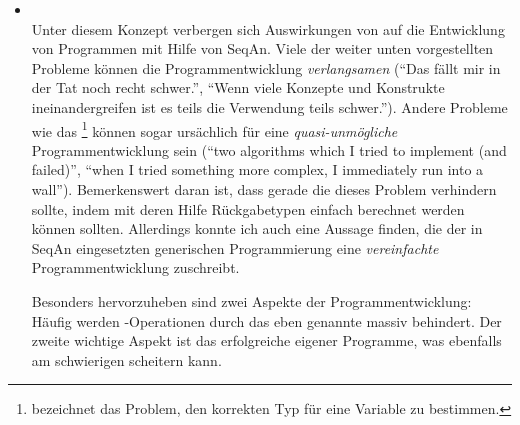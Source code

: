 \begin{itemize}
  \item[\codebullet{apiua://code/-9223372036854775455}] \textbf{} \\
  Unter diesem Konzept verbergen sich Auswirkungen von  auf die Entwicklung von Programmen mit Hilfe von SeqAn. Viele der weiter unten vorgestellten Probleme können die Programmentwicklung \textit{verlangsamen} (``Das fällt mir in der Tat noch recht schwer.'', ``Wenn viele Konzepte und Konstrukte ineinandergreifen ist es teils die Verwendung teils schwer.''). Andere Probleme wie das \footnote{ bezeichnet das Problem, den korrekten Typ für eine Variable zu bestimmen.} können sogar ursächlich für eine \textit{quasi-unmögliche} Programmentwicklung sein (``two algorithms which I tried to implement (and failed)'', ``when I tried something more complex, I immediately run into a wall''). Bemerkenswert daran ist, dass gerade die   dieses Problem verhindern sollte, indem mit deren Hilfe Rückgabetypen einfach berechnet werden können sollten. Allerdings konnte ich auch eine Aussage finden, die der in SeqAn eingesetzten generischen Programmierung eine \textit{vereinfachte} Programmentwicklung zuschreibt.
  
  Besonders hervorzuheben sind zwei Aspekte der Programmentwicklung: Häufig werden -Operationen durch das eben genannte  massiv behindert. Der zweite wichtige Aspekt ist das erfolgreiche  eigener Programme, was ebenfalls am schwierigen  scheitern kann.
  

\end{itemize}
